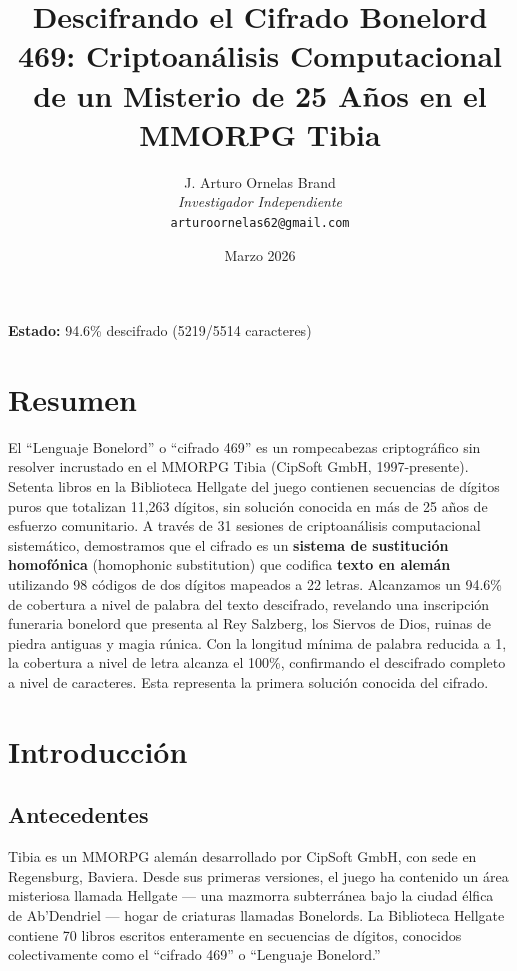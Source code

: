 \documentclass[11pt,a4paper]{article}
\title{Descifrando el Cifrado Bonelord 469: Criptoan\'{a}lisis Computacional de un Misterio de 25 A\~{n}os en el MMORPG Tibia}
\author{
    J. Arturo Ornelas Brand \\
    \textit{Investigador Independiente} \\
    \texttt{arturoornelas62@gmail.com}
}
\date{Marzo 2026}
\begin{document}
\maketitle

\begin{center}
\textbf{Estado:} 94.6\% descifrado (5219/5514 caracteres)
\end{center}

\tableofcontents
\newpage

\section{Resumen}

El ``Lenguaje Bonelord'' o ``cifrado 469'' es un rompecabezas criptogr\'{a}fico sin resolver incrustado en el MMORPG Tibia (CipSoft GmbH, 1997-presente). Setenta libros en la Biblioteca Hellgate del juego contienen secuencias de d\'{i}gitos puros que totalizan 11,263 d\'{i}gitos, sin soluci\'{o}n conocida en m\'{a}s de 25 a\~{n}os de esfuerzo comunitario. A trav\'{e}s de 31 sesiones de criptoan\'{a}lisis computacional sistem\'{a}tico, demostramos que el cifrado es un \textbf{sistema de sustituci\'{o}n homof\'{o}nica} (homophonic substitution) que codifica \textbf{texto en alem\'{a}n} utilizando 98 c\'{o}digos de dos d\'{i}gitos mapeados a 22 letras. Alcanzamos un 94.6\% de cobertura a nivel de palabra del texto descifrado, revelando una inscripci\'{o}n funeraria bonelord que presenta al Rey Salzberg, los Siervos de Dios, ruinas de piedra antiguas y magia r\'{u}nica. Con la longitud m\'{i}nima de palabra reducida a 1, la cobertura a nivel de letra alcanza el 100\%, confirmando el descifrado completo a nivel de caracteres. Esta representa la primera soluci\'{o}n conocida del cifrado.

\section{Introducci\'{o}n}

\subsection{Antecedentes}

Tibia es un MMORPG alem\'{a}n desarrollado por CipSoft GmbH, con sede en Regensburg, Baviera. Desde sus primeras versiones, el juego ha contenido un \'{a}rea misteriosa llamada Hellgate --- una mazmorra subterr\'{a}nea bajo la ciudad \'{e}lfica de Ab'Dendriel --- hogar de criaturas llamadas Bonelords. La Biblioteca Hellgate contiene 70 libros escritos enteramente en secuencias de d\'{i}gitos, conocidos colectivamente como el ``cifrado 469'' o ``Lenguaje Bonelord.''
\end{document}
